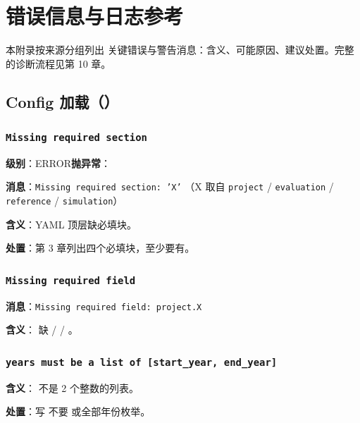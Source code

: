 
\chapter{错误信息与日志参考}

本附录按来源分组列出 \openbench{} 关键错误与警告消息：含义、可能原因、建议处置。完整的诊断流程见第 10 章。


\section{Config 加载（）}

\subsection{\texttt{Missing required section}}

\textbf{级别}：ERROR\quad \textbf{抛异常}：

\textbf{消息}：\texttt{Missing required section: 'X'} （X 取自 \texttt{project} / \texttt{evaluation} / \texttt{reference} / \texttt{simulation}）

\textbf{含义}：YAML 顶层缺必填块。

\textbf{处置}：第 3 章列出四个必填块，至少要有。

\subsection{\texttt{Missing required field}}

\textbf{消息}：\texttt{Missing required field: project.X}

\textbf{含义}： 缺  /  / 。

\subsection{\texttt{years must be a list of [start\_year, end\_year]}}

\textbf{含义}： 不是 2 个整数的列表。

\textbf{处置}：写  不要  或全部年份枚举。

